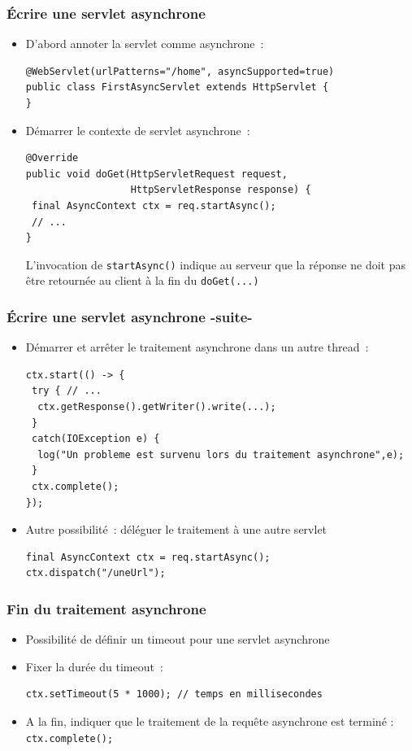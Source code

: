 \documentclass{beamer}
\begin{document}
\begin{frame}[fragile]
	\frametitle{Écrire une servlet asynchrone}
	\begin{itemize}
		\item D'abord annoter la servlet comme asynchrone~:
\begin{lstlisting}
@WebServlet(urlPatterns="/home", asyncSupported=true)
public class FirstAsyncServlet extends HttpServlet {
}
\end{lstlisting}
		\item Démarrer le contexte de servlet asynchrone~:
\begin{lstlisting}
@Override
public void doGet(HttpServletRequest request,
                  HttpServletResponse response) {
 final AsyncContext ctx = req.startAsync();
 // ...
}
\end{lstlisting}
		L'invocation de \texttt{startAsync()} indique au serveur que la réponse ne doit pas être retournée au client à la fin du \texttt{doGet(...)}
	\end{itemize}
\end{frame}

\begin{frame}[fragile]
	\frametitle{Écrire une servlet asynchrone -suite-}
	\begin{itemize}
		\item Démarrer et arrêter le traitement asynchrone dans un autre thread~:
\begin{lstlisting}
ctx.start(() -> {
 try { // ...
  ctx.getResponse().getWriter().write(...);
 }
 catch(IOException e) {
  log("Un probleme est survenu lors du traitement asynchrone",e);
 }
 ctx.complete();
});
\end{lstlisting}
		\item Autre possibilité~: déléguer le traitement à une autre servlet
\begin{lstlisting}
final AsyncContext ctx = req.startAsync();
ctx.dispatch("/uneUrl");
\end{lstlisting}
	\end{itemize}
\end{frame}

\begin{frame}[fragile]
	\frametitle{Fin du traitement asynchrone}
	\begin{itemize}
		\item Possibilité de définir un timeout pour une servlet asynchrone
		\item Fixer la durée du timeout~:
\begin{lstlisting}
ctx.setTimeout(5 * 1000); // temps en millisecondes 
\end{lstlisting}
		\item A la fin, indiquer que le traitement de la requête asynchrone est terminé : \texttt{ctx.complete();}
	\end{itemize}
\end{frame}
\end{document}
